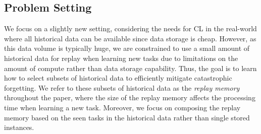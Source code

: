 
\subsection{Problem Setting}\label{sec:problem_setting}



We focus on a slightly new setting, considering the needs for CL in the real-world where all historical data can be available since data storage is cheap. However, as this data volume is typically huge, we are constrained to use a small amount of historical data for replay when learning new tasks due to limitations on the amount of compute rather than data storage capability. 
Thus, the goal is to learn how to select subsets of historical data to efficiently mitigate catastrophic forgetting. %
We refer to these subsets of historical data as the \textit{replay memory} throughout the paper, where the size of the replay memory affects the processing time when learning a new task. %
Moreover, we focus on composing the replay memory based on the seen tasks in the historical data rather than single stored instances. 

\setlength{\abovedisplayskip}{0pt}
\setlength{\belowdisplayskip}{0pt}
\setlength{\abovedisplayshortskip}{0pt}
\setlength{\belowdisplayshortskip}{0pt}

